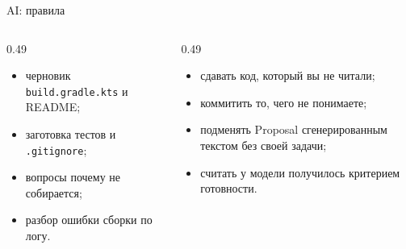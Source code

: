 \begin{frame}{AI: правила}
  \vspace{0.2em}
  \begin{columns}[T]
    \begin{column}{0.49\textwidth}
      \begin{itemize}\setlength\itemsep{0.3em}
        \item черновик \texttt{build.gradle.kts} и README;
        \item заготовка тестов и \texttt{.gitignore};
        \item вопросы \flqq почему не собирается\frqq;
        \item разбор ошибки сборки по логу.
      \end{itemize}
    \end{column}
    \begin{column}{0.49\textwidth}
      \begin{itemize}\setlength\itemsep{0.3em}
        \item сдавать код, который вы не читали;
        \item коммитить то, чего не понимаете;
        \item подменять Proposal сгенерированным текстом без своей задачи;
        \item считать \flqq у модели получилось\frqq{} критерием готовности.
      \end{itemize}
    \end{column}
  \end{columns}
\end{frame}
